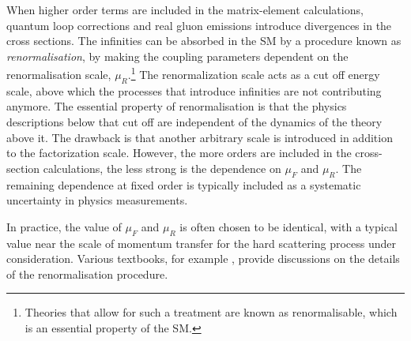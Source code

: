 When higher order terms are included in the matrix-element calculations, quantum loop corrections and real gluon emissions introduce divergences in the cross sections. 
The infinities can be absorbed in the SM by a procedure known as \emph{renormalisation}, by making the coupling parameters dependent on the renormalisation scale, $\mu_R$.\footnote{Theories that allow for such a treatment are known as renormalisable, which is an essential property of the SM.}
The renormalization scale acts as a cut off energy scale, above which the processes that introduce infinities are not contributing anymore. 
The essential property of renormalisation is that the physics descriptions below that cut off are independent of the dynamics of the theory above it. 
The drawback is that another arbitrary scale is introduced in addition to the factorization scale.
However, the more orders are included in the cross-section calculations, the less strong is the dependence on $\mu_F$ and $\mu_R$. 
The remaining dependence at fixed order is typically included as a systematic uncertainty in physics measurements.

In practice, the value of $\mu_F$ and $\mu_R$ is often chosen to be identical, with a typical value near the scale of momentum transfer for the hard scattering process under consideration.
Various textbooks, for example , provide discussions on the details of the renormalisation procedure.

